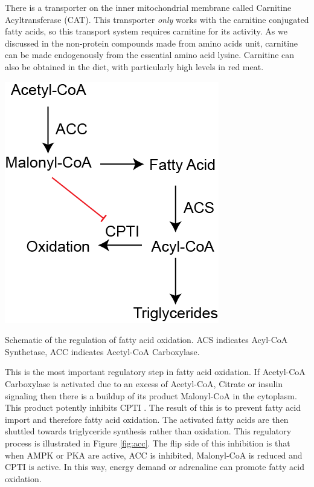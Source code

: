 \documentclass{tufte-handout}
\begin{document}
There is a transporter on the inner mitochondrial membrane called Carnitine Acyltransferase (CAT).  This transporter \emph{only} works with the carnitine conjugated fatty acids, so this transport system requires carnitine for its activity.  As we discussed in the non-protein compounds made from amino acids unit, carnitine can be made endogenously from the essential amino acid lysine.  Carnitine can also be obtained in the diet, with particularly high levels in red meat.


\begin{marginfigure}
\includegraphics{figures/fatty-acid-oxidation.png}
\caption{Schematic of the regulation of fatty acid oxidation.  ACS indicates Acyl-CoA Synthetase, ACC indicates Acetyl-CoA Carboxylase.}
\label{fig:acc}
\end{marginfigure}


  This is the most important regulatory step in fatty acid oxidation.  If Acetyl-CoA Carboxylase is activated due to an excess of Acetyl-CoA, Citrate or insulin signaling then there is a buildup of its product Malonyl-CoA in the cytoplasm.  This product potently inhibits CPTI \citep{McGarry1979}.  The result of this is to prevent fatty acid import and therefore fatty acid oxidation.  The activated fatty acids are then shuttled towards triglyceride synthesis rather than oxidation.  This regulatory process is illustrated in Figure \ref{fig:acc}.  The flip side of this inhibition is that when AMPK or PKA are active, ACC is inhibited, Malonyl-CoA is reduced and CPTI is active.  In this way, energy demand or adrenaline can promote fatty acid oxidation.
\end{document}
